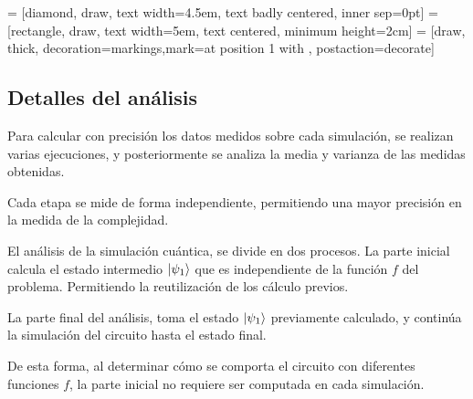 %
\begin{center}
 = [diamond, draw, text width=4.5em, text badly centered, 
inner sep=0pt]
 = [rectangle, draw, text width=5em, text centered, minimum 
height=2cm]
 = [draw, thick, decoration={markings,mark=at position 
1 with {}}, postaction={decorate}]
%
\end{center}
%

\subsection{Detalles del análisis}
Para calcular con precisión los datos medidos sobre cada simulación, se realizan 
varias ejecuciones, y posteriormente se analiza la media y varianza de las 
medidas obtenidas.

Cada etapa se mide de forma independiente, permitiendo una mayor precisión en la 
medida de la complejidad.

El análisis de la simulación cuántica, se divide en dos procesos. La parte 
inicial calcula el estado intermedio $\ket{\psi_{1}}$ que es independiente de la 
función $f$ del problema. Permitiendo la reutilización de los cálculo previos.

La parte final del análisis, toma el estado $\ket{\psi_{1}}$ previamente calculado, y 
continúa la simulación del circuito hasta el estado final.

De esta forma, al determinar cómo se comporta el circuito con diferentes 
funciones $f$, la parte inicial no requiere ser computada en cada simulación.


